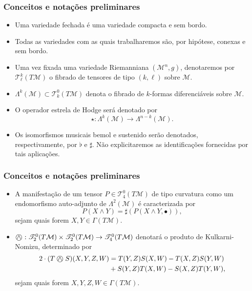 \documentclass{beamer}
\newcommand{\KN}{\mathbin{\bigcirc\mspace{-15mu}\wedge\mspace{4mu}}}
\newcommand{\mm}{\mathcal{M}}
\newcommand{\parent}[1]{\left( #1 \right)}
\newcommand{\T}{\mathscr{T}}
\newcommand{\be}{\mathbf{e}}
\begin{document}
\begin{frame}
\frametitle{Conceitos e notações preliminares}
\begin{itemize}
\item Uma variedade fechada é uma variedade compacta e sem bordo. 
\item Todas as variedades com as quais trabalharemos são, por hipótese, conexas e sem bordo.
\item Uma vez fixada uma variedade Riemanniana $\parent{\mm^n, g}$, denotaremos por $\T^{k}_{\ell}\parent{T \mm}$ o fibrado de tensores de tipo $(k, \ell)$ sobre $\mm$. 
\item $\Lambda^k\parent{\mm} \subset \T^0_k\parent{T \mm}$ denota o fibrado de $k$-formas diferenciáveis sobre $\mm$. 
\item O operador estrela de Hodge será denotado por $$\star: \Lambda^k\parent{ \mm} \to \Lambda^{n-k}\parent{\mm}.$$
\item Os isomorfismos musicais bemol e sustenido serão denotados, respectivamente, por $\flat$ e $\sharp$. Não explicitaremos as identificações fornecidas por tais aplicações.

\end{itemize}
\end{frame}

\begin{frame}
\frametitle{Conceitos e notações preliminares}
\begin{itemize}
\item A manifestação de um tensor $P \in \T^{0}_4\parent{ T \mm}$ de tipo curvatura como um endomorfismo auto-adjunto de $\Lambda^2\parent{\mm}$ é caracterizada por
\[
P\parent{X \wedge Y} = \sharp\parent{P\parent{X \wedge Y, \bullet}},
\]
sejam quais forem $X, Y \in \Gamma\parent{T \mm}$. 
\item $\KN: \T^{0}_2(T \mm) \times \T^{0}_2(T \mm)\to \T^{0}_4(T \mm)$ denotará o produto de Kulkarni-Nomizu, determinado por
\[  \begin{aligned} 2 \cdot (T \KN S)(X, Y, Z, W) &= T(Y, Z) S(X, W) - T(X, Z) S(Y, W) \\ 
&+ S(Y, Z) T(X, W) - S(X, Z) T(Y, W),
\end{aligned}
 \]
sejam quais forem $X, Y, Z, W \in \Gamma\parent{T \mm}$.
\end{itemize}
\end{frame}
\end{document}
